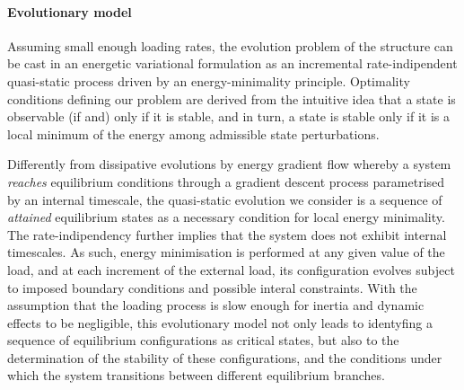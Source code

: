 




\paragraph{Evolutionary model}
\label{sec:stability}

Assuming small enough loading rates, 
the evolution problem of the structure can be cast in an energetic variational formulation as an incremental rate-indipendent quasi-static process driven by an energy-minimality principle.
Optimality conditions defining our problem are derived from the
intuitive idea that a state is observable (if and) only if it is stable, and in turn, a state is stable only if it is a local minimum of the energy among admissible state perturbations. 

Differently from dissipative evolutions by energy gradient flow whereby a system \emph{reaches} equilibrium conditions through a gradient descent process parametrised by an internal timescale, the quasi-static evolution we consider is a sequence of \emph{attained} equilibrium states as a necessary condition for local energy minimality. 
The rate-indipendency further implies that the system does not exhibit internal timescales.
As such, energy minimisation is performed at any given value of the load, and at each increment of the external load, its configuration evolves subject to imposed boundary conditions and possible interal constraints.
With the assumption that the loading process is slow enough for inertia and dynamic effects to be negligible, this evolutionary model not only leads to identyfing a sequence of equilibrium configurations as critical states, but also to the determination of the stability of these configurations, and the conditions under which the system transitions between different equilibrium branches.
% 

